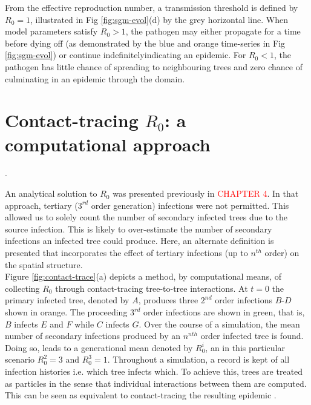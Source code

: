 \begin{fi}
From the effective reproduction number, a transmission threshold is defined by $R_0=1$, illustrated in Fig \ref{fig:sgm-evol}(d) by the grey horizontal line. When model parameters satisfy $R_0>1$, the pathogen may either propagate for a time before dying off (as demonstrated by the blue and orange time-series in Fig \ref{fig:sgm-evol}) or continue indefinitely\textemdash indicating an epidemic. For $R_0<1$, the pathogen has little chance of spreading to neighbouring trees and zero chance of culminating in an epidemic through the domain\protect\footnotemark {}.\\



\section{Contact-tracing $R_0$: a computational approach}.

An analytical solution to $R_0$ was presented previously in \textcolor{red}{CHAPTER 4}. %
In that approach, tertiary ($3^{rd}$ order generation) infections were not permitted. %
This allowed us to solely count the number of secondary infected trees due to the source infection. %
This is likely to over-estimate the number of secondary infections an infected tree could produce. %
Here, an alternate definition is presented that incorporates the effect of tertiary infections %
(up to $n^{th}$ order)  on the spatial structure.\\

Figure \ref{fig:contact-trace}(a) depicts a method, by computational means, of collecting $R_0$ %
through contact-tracing tree-to-tree interactions. %
At $t=0$ the primary infected tree, denoted by $A$, produces three $2^{nd}$ order infections %
$B$-$D$ shown in orange. %
The proceeding $3^{rd}$ order infections are shown in green, that is, $B$ infects $E$ and $F$ while $C$ infects $G$. %
Over the course of a simulation, the mean number of secondary infections produced by an $n^{nth}$ order infected tree is found. %
Doing so, leads to a generational mean denoted by $R^i_0$, an in this particular scenario $R^2_0=3$ and $R^3_0=1$. 
Throughout a simulation, a record is kept of all infection histories i.e. which tree infects which. 
To achieve this, trees are treated as particles in the sense that individual interactions between them are computed. 
This can be seen as equivalent to contact-tracing the resulting epidemic \cite{eames2003contact}. \\


\end{fi}
